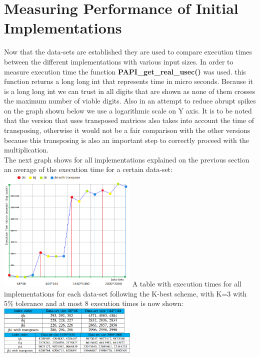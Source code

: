 \documentclass[journal]{IEEEtran}
\begin{document}
\section{Measuring Performance of Initial Implementations}

Now that the data-sets are established they are used to compare execution times between the different implementations with various input sizes. In order to measure execution time the function \textbf{PAPI\_get\_real\_usec()} was used. this function returns a long long int that represents time in micro seconds. Because it is a long long int we can trust in all digits that are shown as none of them crosses the maximum number of viable digits. Also in an attempt to reduce abrupt spikes on the graph shown below we use a logarithmic scale on Y axis. It is to be noted that the version that uses transposed matrices also takes into account the time of transposing, otherwise it would not be a fair comparison with the other versions because this transposing is also an important step to correctly proceed with the multiplication.\\
The next graph shows for all implementations explained on the previous section an average of the execution time for a certain data-set:
\includegraphics[width=0.50\textwidth,left]{tt.png}
A table with execution times for all implementations for each data-set following the K-best scheme, with K=3 with 5\% tolerance and at most 8 execution times is now shown:\\
\includegraphics[width=0.50\textwidth, left]{tempinhos.png}
\end{document}
